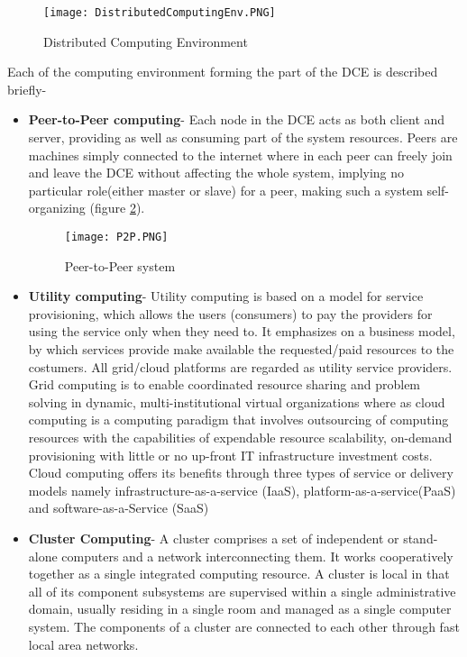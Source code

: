 \begin{figure}[ht!]
\centering
\texttt{[image: DistributedComputingEnv.PNG]}
\caption{Distributed Computing Environment}
\label{fig:DistributedComputingEnv}
\end{figure}

Each of the computing environment forming the part of the DCE is described briefly-
\begin{itemize}
\item \textbf{Peer-to-Peer computing}- Each node in the DCE acts as both client and server, providing as well as consuming part of the system resources. Peers are machines simply connected to the internet where in each peer can freely join and leave the DCE without affecting the whole system, implying no particular role(either master or slave) for a peer, making such a system self-organizing (figure \ref{fig:P2P}).

\begin{figure}[ht!]
\centering
\texttt{[image: P2P.PNG]}
\caption{Peer-to-Peer system}
\label{fig:P2P}
\end{figure}

\item \textbf{Utility computing}- Utility computing is based on a model for service provisioning, which allows the users (consumers) to pay the providers for using the service only when they need to. It emphasizes on a business model, by which services provide make available the requested/paid resources to the costumers. All grid/cloud platforms are regarded as utility service providers. Grid computing is to enable coordinated resource sharing and problem solving in dynamic, multi-institutional virtual organizations where as cloud computing is a computing paradigm that involves outsourcing of computing resources with the capabilities of expendable resource scalability, on-demand provisioning with little or no up-front IT infrastructure investment costs. Cloud computing offers its benefits through
three types of service or delivery models namely infrastructure-as-a-service (IaaS), platform-as-a-service(PaaS) and software-as-a-Service (SaaS) 

\item \textbf{Cluster Computing}- A cluster comprises a set of independent or stand-alone computers and a network interconnecting them. It
works cooperatively together as a single integrated computing resource. A cluster is local in that all of its component subsystems are supervised within a single administrative domain, usually residing in a single room and managed as a single computer system. The components of a cluster are connected to each other through fast local area networks. 


\end{itemize}
